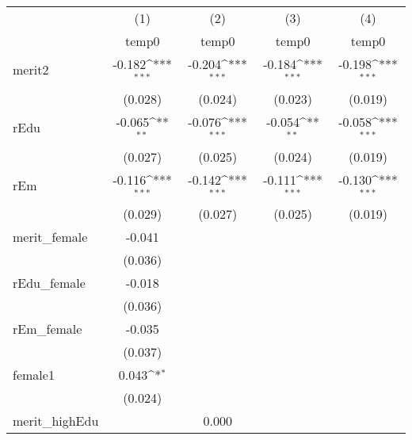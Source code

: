 {
\def\sym#1{\ifmmode^{#1}\else\(^{#1}\)\fi}
\begin{tabular}{l*{4}{c}}
\toprule
            &\multicolumn{1}{c}{(1)}&\multicolumn{1}{c}{(2)}&\multicolumn{1}{c}{(3)}&\multicolumn{1}{c}{(4)}\\
            &\multicolumn{1}{c}{temp0}&\multicolumn{1}{c}{temp0}&\multicolumn{1}{c}{temp0}&\multicolumn{1}{c}{temp0}\\
\midrule
merit2      &      -0.182\sym{***}&      -0.204\sym{***}&      -0.184\sym{***}&      -0.198\sym{***}\\
            &     (0.028)         &     (0.024)         &     (0.023)         &     (0.019)         \\
\addlinespace
rEdu        &      -0.065\sym{**} &      -0.076\sym{***}&      -0.054\sym{**} &      -0.058\sym{***}\\
            &     (0.027)         &     (0.025)         &     (0.024)         &     (0.019)         \\
\addlinespace
rEm         &      -0.116\sym{***}&      -0.142\sym{***}&      -0.111\sym{***}&      -0.130\sym{***}\\
            &     (0.029)         &     (0.027)         &     (0.025)         &     (0.019)         \\
\addlinespace
merit\_female&      -0.041         &                     &                     &                     \\
            &     (0.036)         &                     &                     &                     \\
\addlinespace
rEdu\_female &      -0.018         &                     &                     &                     \\
            &     (0.036)         &                     &                     &                     \\
\addlinespace
rEm\_female  &      -0.035         &                     &                     &                     \\
            &     (0.037)         &                     &                     &                     \\
\addlinespace
female1     &       0.043\sym{*}  &                     &                     &                     \\
            &     (0.024)         &                     &                     &                     \\
\addlinespace
merit\_highEdu&                     &       0.000         &                     &                     \\

\end{tabular}}
